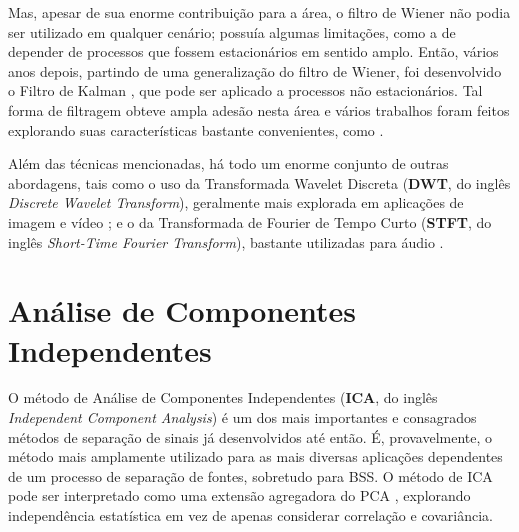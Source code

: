 
Mas, apesar de sua enorme contribuição para a área, o filtro de Wiener não podia ser utilizado em qualquer cenário; possuía algumas limitações, como a de depender de processos que fossem estacionários em sentido amplo. Então, vários anos depois, partindo de uma generalização do filtro de Wiener, foi desenvolvido o Filtro de Kalman \citep{kalman1960new}, que pode ser aplicado a processos não estacionários. Tal forma de filtragem obteve ampla adesão nesta área e vários trabalhos foram feitos explorando suas características bastante convenientes, como \citep{701367, 1169756, 91144}.

Além das técnicas mencionadas, há todo um enorme conjunto de outras abordagens, tais como o uso da Transformada Wavelet Discreta (\textbf{DWT}, do inglês \textit{Discrete Wavelet Transform}), geralmente mais explorada em aplicações de imagem e vídeo \citep{119727, doi:10.1175/1520-0477, 336245}; e o da Transformada de Fourier de Tempo Curto (\textbf{STFT}, do inglês \textit{Short-Time Fourier Transform}), bastante utilizadas para áudio \citep{622558, 1164910, 4156182, 1164162, 466662}.





\section{Análise de Componentes Independentes}
\label{sec:bss_ica}

O método de Análise de Componentes Independentes (\textbf{ICA}, do inglês \textit{Independent Component Analysis}) é um dos mais importantes e consagrados métodos de separação de sinais já desenvolvidos até então. É, provavelmente, o método mais amplamente utilizado para as mais diversas aplicações dependentes de um processo de separação de fontes, sobretudo para BSS. O método de ICA pode ser interpretado como uma extensão agregadora do PCA \citep{COMON1994287}, explorando independência estatística em vez de apenas considerar correlação e covariância.


